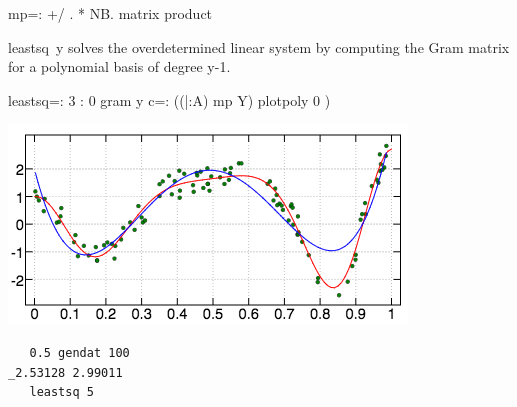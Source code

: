 \documentclass[10pt]{article}%
\begin{document}
\nwendcode{}\plusendmoddef\nwstartdeflinemarkup{}\nwenddeflinemarkup
mp=: +/ . * NB. matrix product

\nwendcode{}\nwdocspar

{\Tt{}leastsq\ y\nwendquote} solves the overdetermined linear system by computing the Gram
matrix for a polynomial basis of degree {\Tt{}y-1\nwendquote}.

\nwenddocs{}\plusendmoddef\nwstartdeflinemarkup{}\nwenddeflinemarkup
leastsq=: 3 : 0
  gram y
  c=: ((|:A) mp Y) %
  plotpoly 0
)

\nwendcode{}\nwdocspar
\noindent\begin{minipage}{0.5\textwidth}
\includegraphics[width=\linewidth]{leastsq5}
\end{minipage}%
\hfill%
\begin{minipage}{0.4\textwidth}
\begin{verbatim}
   0.5 gendat 100
_2.53128 2.99011
   leastsq 5
\end{verbatim}
\end{minipage}
\end{document}
